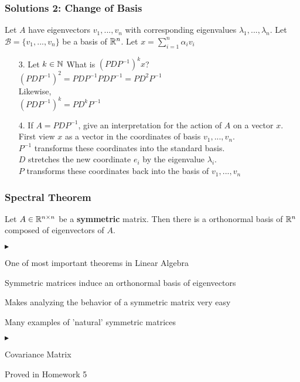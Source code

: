 \documentclass{beamer}
\renewenvironment{itemize}
\renewenvironment{enumerate}%
{\begin{list}{\arabic{enumi}.}%
      {\setlength{\leftmargin}{2.5em}%
       \setlength{\itemsep}{-\parsep}%
       \setlength{\topsep}{-\parskip}%
       \usecounter{enumi}}%
 }{\end{list}}
\renewenvironment{itemize}%
{\begin{list}{$\blacktriangleright$}%
      {\setlength{\leftmargin}{2.5em}%
       \setlength{\itemsep}{-\parsep}%
       \setlength{\topsep}{-\parskip}%
       \usecounter{enumi}}%
 }{\end{list}}
\begin{document}
\begin{frame}
\frametitle{Solutions 2: Change of Basis}
Let $A$ have eigenvectors $v_1,...,v_n$ with corresponding eigenvalues $\lambda_1,...,\lambda_n$.
Let $\mathcal{B} = \{v_1,...,v_n\}$ be a basis of $\mathbb{R}^n$. Let $x = \sum_{i=1}^n \alpha_iv_i$
\begin{solution}
\begin{enumerate}

\item[3.] Let $k\in \mathbb{N}$ What is $(PDP^{-1})^kx$?\\
\qquad $(PDP^{-1})^2 = PDP^{-1}PDP^{-1} = PD^2P^{-1}$ \\
Likewise,\\
\qquad $(PDP^{-1})^k = PD^kP^{-1}$ \\

\item[4.] If $A = PDP^{-1}$, give an interpretation for the action of $A$ on a vector $x$.\\
First view $x$ as a vector in the coordinates of basis $v_1,...,v_n$. \\ 
$P^{-1}$ transforms these coordinates into the standard basis. \\
$D$ stretches the new coordinate $e_i$ by the eigenvalue $\lambda_i$. \\
$P$ transforms these coordinates back into the basis of $v_1,...,v_n$ \\

\end{enumerate}
\end{solution}
\end{frame}

\begin{frame}
\frametitle{Spectral Theorem}

\begin{theorem}\label{th:spectral}
	Let $A \in \mathbb{R}^{n \times n}$ be a \textbf{symmetric} matrix. Then there is a orthonormal basis of $\mathbb{R}^n$ composed of eigenvectors of $A$.
\end{theorem}

\begin{itemize}
\item One of most important theorems in Linear Algebra
\item Symmetric matrices induce an orthonormal basis of eigenvectors
\item Makes analyzing the behavior of a symmetric matrix very easy
\item Many examples of 'natural' symmetric matrices
\begin{itemize}
\item Covariance Matrix
\end{itemize}
\item Proved in Homework 5
\end{itemize}
\end{frame}
\end{document}
